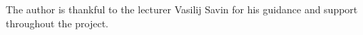 \documentclass[]{VUMIFTemplateClass}
\begin{document}

\onehalfspacing


\tableofcontents
\onehalfspacing


The author is thankful to the lecturer Vasilij Savin for his guidance and
support throughout the project.











\end{document}
